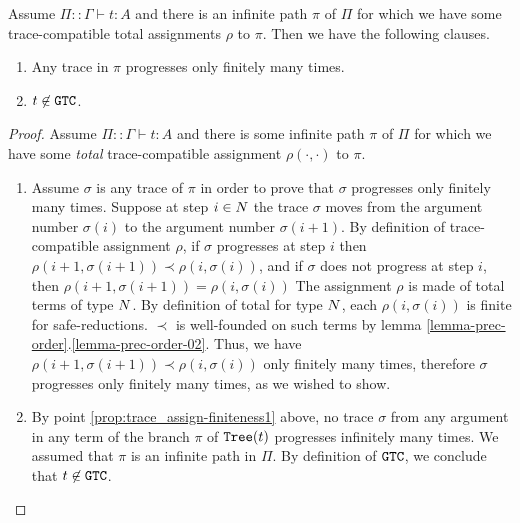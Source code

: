 \begin{proposition}\label{prop:trace_assign-finiteness}
Assume $\Pi::\Gamma \vdash t:A$ 
and there is an infinite path $\pi$ of $\Pi$ for which we have
some trace-compatible total assignments $\rho$ to $\pi$. Then we have the following clauses. 
\begin{enumerate}
\item\label{prop:trace_assign-finiteness1}
Any trace in $\pi$ progresses only finitely many times.
\item\label{prop:trace_assign-finiteness2}
$t \not \in {\tt GTC}$.
\end{enumerate}
\end{proposition}
\begin{proof}%
Assume $\Pi::\Gamma \vdash t:A$ and there is some infinite path $\pi$ of $\Pi$ for which we 
have some \emph{total} trace-compatible assignment  $\rho(\cdot,\cdot)$ to $\pi$.
\begin{enumerate}
\item
Assume $\sigma$ is any trace of $\pi$ in order to prove
that $\sigma$ progresses only finitely many times.
Suppose at step $i \in {N}$ the trace $\sigma$ moves from the argument number 
$\sigma(i)$ to the argument number $\sigma(i+1)$.
By definition of trace-compatible assignment $\rho$, if $\sigma$ progresses at step $i$
then $\rho(i+1,\sigma(i+1))\prec \rho(i,\sigma(i))$, and if $\sigma$ 
does not progress at step $i$,  then  $\rho(i+1,\sigma(i+1)) = \rho(i,\sigma(i))$
The assignment $\rho$ is made of total terms of type ${N}$.
By definition of total for type ${N}$, each $\rho(i,\sigma(i))$ is finite for safe-reductions. 
$\prec$ is well-founded on such terms
by lemma \ref{lemma-prec-order}.\ref{lemma-prec-order-02}.
Thus, we have $\rho(i+1,\sigma(i+1))\prec \rho(i,\sigma(i))$ only finitely many times, 
therefore $\sigma$ progresses only finitely many times, as we wished to show.

\item
By point \ref{prop:trace_assign-finiteness1} above, no trace $\sigma$ 
from any argument in any term of the branch $\pi$ of ${\tt Tree}(t)$ progresses infinitely many 
times. We assumed that $\pi$ is an infinite path in $\Pi$.
By definition of ${\tt GTC}$, we conclude that $t \not \in {\tt GTC}$. 
\end{enumerate}
\end{proof}


